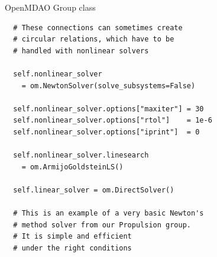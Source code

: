 \begin{frame}[fragile]{OpenMDAO Group class}
  \begin{lstlisting}
  # These connections can sometimes create
  # circular relations, which have to be
  # handled with nonlinear solvers

  self.nonlinear_solver
    = om.NewtonSolver(solve_subsystems=False)

  self.nonlinear_solver.options["maxiter"] = 30
  self.nonlinear_solver.options["rtol"]    = 1e-6
  self.nonlinear_solver.options["iprint"]  = 0

  self.nonlinear_solver.linesearch
    = om.ArmijoGoldsteinLS()

  self.linear_solver = om.DirectSolver()

  # This is an example of a very basic Newton's
  # method solver from our Propulsion group.
  # It is simple and efficient
  # under the right conditions
  \end{lstlisting}
\end{frame}
